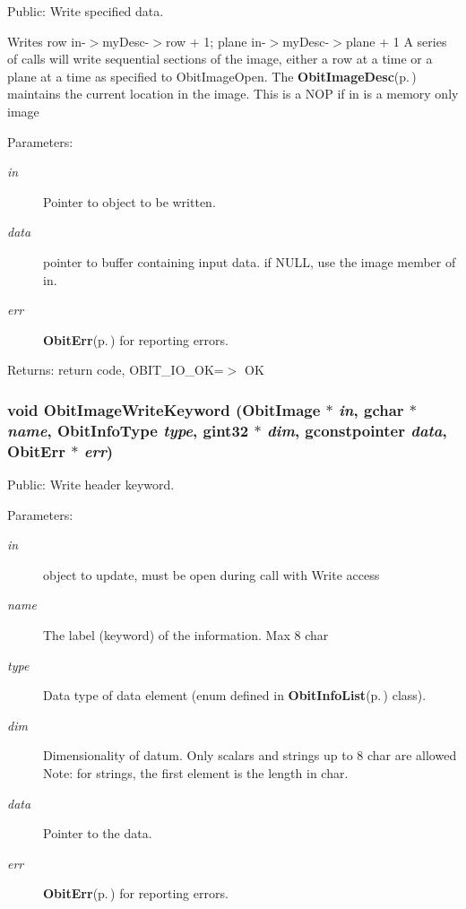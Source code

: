 Public: Write specified data. 

Writes row in-$>$my\-Desc-$>$row + 1; plane in-$>$my\-Desc-$>$plane + 1 A series of calls will write sequential sections of the image, either a row at a time or a plane at a time as specified to Obit\-Image\-Open. The {\bf Obit\-Image\-Desc}{\rm (p.\,\pageref{structObitImageDesc})} maintains the current location in the image. This is a NOP if in is a memory only image \begin{Desc}
\item[Parameters:]
\begin{description}
\item[{\em in}]Pointer to object to be written. \item[{\em data}]pointer to buffer containing input data. if NULL, use the image member of in. \item[{\em err}]{\bf Obit\-Err}{\rm (p.\,\pageref{structObitErr})} for reporting errors. \end{description}
\end{Desc}
\begin{Desc}
\item[Returns:]return code, OBIT\_\-IO\_\-OK=$>$ OK \end{Desc}
\subsubsection{\setlength{\rightskip}{0pt plus 5cm}void Obit\-Image\-Write\-Keyword ({\bf Obit\-Image} $\ast$ {\em in}, gchar $\ast$ {\em name}, Obit\-Info\-Type {\em type}, gint32 $\ast$ {\em dim}, gconstpointer {\em data}, {\bf Obit\-Err} $\ast$ {\em err})}\label{ObitImage_8c_a33}


Public: Write header keyword. 

\begin{Desc}
\item[Parameters:]
\begin{description}
\item[{\em in}]object to update, must be open during call with Write access \item[{\em name}]The label (keyword) of the information. Max 8 char \item[{\em type}]Data type of data element (enum defined in {\bf Obit\-Info\-List}{\rm (p.\,\pageref{structObitInfoList})} class). \item[{\em dim}]Dimensionality of datum. Only scalars and strings up to 8 char are allowed Note: for strings, the first element is the length in char. \item[{\em data}]Pointer to the data. \item[{\em err}]{\bf Obit\-Err}{\rm (p.\,\pageref{structObitErr})} for reporting errors. \end{description}
\end{Desc}
